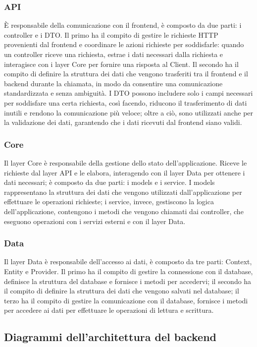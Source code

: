 \subsubsection{API}
È responsabile della comunicazione con il frontend, è composto da due parti: i controller e i DTO. Il primo ha il compito di gestire le richieste HTTP provenienti dal frontend e coordinare le azioni richieste per soddisfarle: quando un controller riceve una richiesta, estrae i dati necessari dalla richiesta e interagisce con i layer Core per fornire una risposta al Client. 
Il secondo ha il compito di definire la struttura dei dati che vengono trasferiti tra il frontend e il backend durante la chiamata, in modo da consentire una comunicazione standardizzata e senza ambiguità. I DTO possono includere solo i campi necessari per soddisfare una certa richiesta, così facendo, riducono il trasferimento di dati inutili e rendono la comunicazione più veloce; oltre a ciò, sono utilizzati anche per la validazione dei dati, garantendo che i dati ricevuti dal frontend siano validi.\\
\subsubsection{Core}
Il layer Core è responsabile della gestione dello stato dell'applicazione. Riceve le richieste dal layer API e le elabora, interagendo con il layer Data per ottenere i dati necessari; è composto da due parti: i models e i service. I models rappresentano la struttura dei dati che vengono utilizzati dall'applicazione per effettuare le operazioni richieste; i service, invece, gestiscono la logica dell'applicazione, contengono i metodi che vengono chiamati dai controller, che eseguono operazioni con i servizi esterni e con il layer Data.\\
\subsubsection{Data}
Il layer Data è responsabile dell'accesso ai dati, è composto da tre parti: Context, Entity e Provider. Il primo ha il compito di gestire la connessione con il database, definisce la struttura del database e fornisce i metodi per accedervi; il secondo ha il compito di definire la struttura dei dati che vengono salvati nel database; il terzo ha il compito di gestire la comunicazione con il database, fornisce i metodi per accedere ai dati per effettuare le operazioni di lettura e scrittura.\\
\subsection{Diagrammi dell'architettura del backend}
